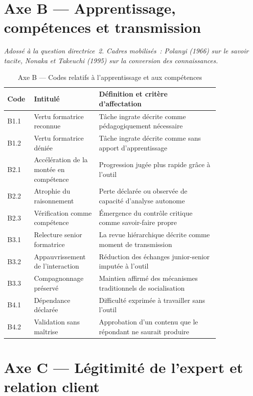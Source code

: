 \section{Axe B --- Apprentissage, compétences et transmission}

\textit{Adossé à la question directrice~2. Cadres mobilisés~: Polanyi (1966) sur le
savoir tacite, Nonaka et Takeuchi (1995) sur la conversion des connaissances.}

\begin{table}[h]
\centering
\small
\begin{tabular}{|p{0.08\linewidth}|p{0.27\linewidth}|p{0.51\linewidth}|}
\hline
\textbf{Code} & \textbf{Intitulé} & \textbf{Définition et critère d'affectation} \\
\hline
B1.1 & Vertu formatrice reconnue & Tâche ingrate décrite comme pédagogiquement nécessaire \\
\hline
B1.2 & Vertu formatrice déniée & Tâche ingrate décrite comme sans apport d'apprentissage \\
\hline
B2.1 & Accélération de la montée en compétence & Progression jugée plus rapide grâce à l'outil \\
\hline
B2.2 & Atrophie du raisonnement & Perte déclarée ou observée de capacité d'analyse autonome \\
\hline
B2.3 & Vérification comme compétence & Émergence du contrôle critique comme savoir-faire propre \\
\hline
B3.1 & Relecture senior formatrice & La revue hiérarchique décrite comme moment de transmission \\
\hline
B3.2 & Appauvrissement de l'interaction & Réduction des échanges junior-senior imputée à l'outil \\
\hline
B3.3 & Compagnonnage préservé & Maintien affirmé des mécanismes traditionnels de socialisation \\
\hline
B4.1 & Dépendance déclarée & Difficulté exprimée à travailler sans l'outil \\
\hline
B4.2 & Validation sans maîtrise & Approbation d'un contenu que le répondant ne saurait produire \\
\hline
\end{tabular}
\caption{Axe B --- Codes relatifs à l'apprentissage et aux compétences}
\label{tab:codebook-b}
\end{table}

\section{Axe C --- Légitimité de l'expert et relation client}

